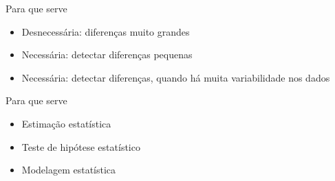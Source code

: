 \documentclass{beamer}
\begin{document}

\begin{frame}{Para que serve}
  \begin{itemize}
  \item Desnecessária: diferenças muito grandes
  \item Necessária: detectar diferenças pequenas
  \item Necessária: detectar diferenças, quando há muita variabilidade nos dados
  \end{itemize}
\end{frame}


\begin{frame}{Para que serve}
  \begin{itemize}
  \item Estimação estatística
  \item Teste de hipótese estatístico
  \item Modelagem estatística
  \end{itemize}
\end{frame}


\end{document}
